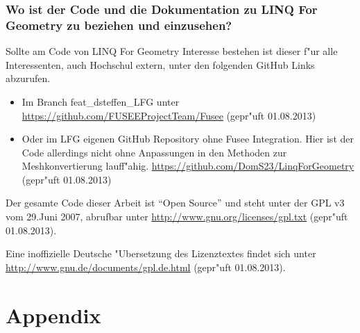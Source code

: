 \documentclass[pagesize, paper=a4, fontsize=12pt,titlepage=true, headings=small, headnosepline, abstractoff, liststotoc, nochapterprefix, plainheadsepline]{scrreprt}
\newcommand{\LFGS}{LINQ For Geometry }
\begin{document}
\newpage
\section {Wo ist der Code und die Dokumentation zu \LFGS zu beziehen und einzusehen?}
	Sollte am Code von \LFGS Interesse bestehen ist dieser f"ur alle Interessenten, auch Hochschul extern, unter den folgenden GitHub Links abzurufen.
\begin{itemize}
\item Im Branch feat\_dsteffen\_LFG unter \url{https://github.com/FUSEEProjectTeam/Fusee} (gepr"uft 01.08.2013)
\item Oder im LFG eigenen GitHub Repository ohne Fusee Integration. Hier ist der Code allerdings nicht ohne Anpassungen in den Methoden zur Meshkonvertierung lauff"ahig. \url{https://github.com/DomS23/LinqForGeometry} (gepr"uft 01.08.2013)
\end{itemize}

Der gesamte Code dieser Arbeit ist "`Open Source"' und steht unter der GPL v3 vom 29.Juni 2007, abrufbar unter \url{http://www.gnu.org/licenses/gpl.txt} (gepr"uft 01.08.2013).
\newline

Eine inoffizielle Deutsche "Ubersetzung des Lizenztextes findet sich unter \url{http://www.gnu.de/documents/gpl.de.html} (gepr"uft 01.08.2013).



\part*{Appendix}
\lstlistoflistings
\newpage

\nocite{*}

\newpage
\end{document}
